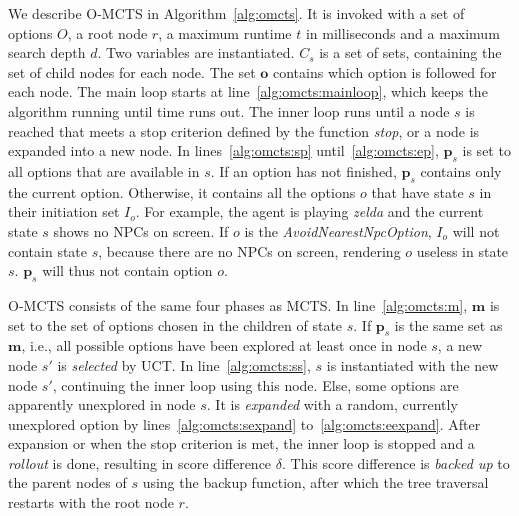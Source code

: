We describe O-MCTS in Algorithm~\ref{alg:omcts}. It is invoked with a set of
options $O$, a root node $r$, a maximum runtime $t$ in milliseconds and a
maximum search depth $d$. Two variables are instantiated. $C_s$ is a set of
sets, containing the set of child nodes for each node. The set $\mathbf{o}$
contains which option is followed for each node. The main loop starts at 
line~\ref{alg:omcts:mainloop}, which keeps the algorithm running until time runs out.
The inner loop runs until a node $s$ is reached that meets a stop criterion
defined by the function \emph{stop}, or a node is expanded into a new node.
In lines~\ref{alg:omcts:sp} until~\ref{alg:omcts:ep}, $\mathbf{p}_s$ is set to
all options that are available in $s$. If an option has not finished,
$\mathbf{p}_s$ contains only the current option. Otherwise, it contains all the
options $o$ that have state $s$ in their initiation set $I_o$. For example, the
agent is playing \textit{zelda} and the current state $s$ shows no NPCs on
screen. If $o$ is the \textit{AvoidNearestNpcOption}, $I_o$ will not contain
state $s$, because there are no NPCs on screen, rendering $o$ useless in state
$s$. $\mathbf{p}_s$ will thus not contain option $o$.

O-MCTS consists of the same four phases as MCTS\@. In line~\ref{alg:omcts:m},
$\mathbf{m}$ is set to the set of options chosen in the children of state $s$.
If $\mathbf{p}_s$ is the same set as $\mathbf{m}$, i.e., all possible options
have been explored at least once in node $s$, a new node $s'$ is \emph{selected}
by UCT\@. In line~\ref{alg:omcts:ss}, $s$ is instantiated with the new
node $s'$, continuing the inner loop using this node.  Else, some options are
apparently unexplored in node $s$. It is \emph{expanded} with a random,
currently unexplored option by lines~\ref{alg:omcts:sexpand}
to~\ref{alg:omcts:eexpand}. After expansion or when the stop criterion is met,
the inner loop is stopped and a \emph{rollout} is done, resulting in score
difference $\delta$. This score difference is \emph{backed up} to the parent
nodes of $s$ using the backup function, after which the tree traversal restarts
with the root node $r$.

